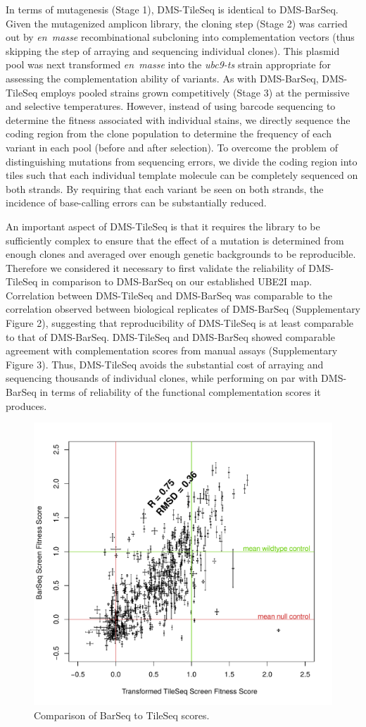 In terms of mutagenesis (Stage 1), DMS-TileSeq is identical to DMS-BarSeq.  Given the mutagenized amplicon library, the cloning step (Stage 2) was carried out by \textit{en~masse} recombinational subcloning into complementation vectors (thus skipping the step of arraying and sequencing individual clones).  This plasmid pool was next transformed \textit{en~masse} into the \textit{ubc9-ts} strain appropriate for assessing the complementation ability of  variants. As with DMS-BarSeq, DMS-TileSeq employs pooled strains grown competitively (Stage 3) at the permissive and selective temperatures. However, instead of using barcode sequencing to determine the fitness associated with individual stains, we directly sequence the coding region from the clone population to determine the frequency of each variant in each pool (before and after selection). To overcome the problem of distinguishing mutations from sequencing errors, we divide the coding region into tiles such that each individual template molecule can be completely sequenced on both strands.  By requiring that each variant be seen on both strands, the incidence of base-calling errors can be substantially reduced. %

An important aspect of DMS-TileSeq is that it requires the library to be sufficiently complex to ensure that the effect of a mutation is determined from enough clones and averaged over enough genetic backgrounds to be reproducible. Therefore we considered it necessary to first validate the reliability of DMS-TileSeq in comparison to DMS-BarSeq on our established UBE2I map. Correlation between DMS-TileSeq and DMS-BarSeq was comparable to the correlation observed between biological replicates of DMS-BarSeq (Supplementary Figure 2), suggesting that reproducibility of DMS-TileSeq is at least comparable to that of DMS-BarSeq. DMS-TileSeq and DMS-BarSeq showed comparable agreement with complementation scores from manual assays (Supplementary Figure 3).  Thus, DMS-TileSeq avoids the substantial cost of arraying and sequencing thousands of individual clones, while performing on par with DMS-BarSeq in terms of reliability of the functional complementation scores it produces.

\begin{figure}[h!]
	\centering
	\includegraphics[width=.7\textwidth]{img/barVtile.pdf}
	\caption{Comparison of BarSeq to TileSeq scores. }
	\label{fig:barVtile}
\end{figure}

